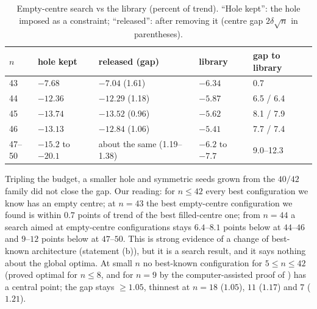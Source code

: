 \documentclass[11pt]{amsart}
\theoremstyle{definition}
\begin{document}
\begin{table}[htbp]
\centering\small
\caption{Empty-centre search vs the library (percent of trend). ``Hole kept'': the hole imposed as a constraint; ``released'': after removing it (centre gap $2\delta\sqrt n$ in parentheses).}\label{tab:emptycentre}
\begin{tabular}{@{}lllll@{}}
\toprule
$n$ & hole kept & released (gap) & library & gap to library \\
\midrule
43 & $-7.68$ & $-7.04$ (1.61) & $-6.34$ & 0.7 \\
44 & $-12.36$ & $-12.29$ (1.18) & $-5.87$ & 6.5 / 6.4 \\
45 & $-13.74$ & $-13.52$ (0.96) & $-5.62$ & 8.1 / 7.9 \\
46 & $-13.13$ & $-12.84$ (1.06) & $-5.41$ & 7.7 / 7.4 \\
47--50 & $-15.2$ to $-20.1$ & about the same (1.19--1.38) & $-6.2$ to $-7.7$ & 9.0--12.3 \\
\bottomrule
\end{tabular}
\end{table}

Tripling the budget, a smaller hole and symmetric seeds grown from the $40/42$ family did not close the gap. Our reading: for $n \le 42$ every best configuration we know has an empty centre; at $n = 43$ the best empty-centre configuration we found is within $0.7$ points of trend of the best filled-centre one; from $n = 44$ a search aimed at empty-centre configurations stays $6.4$--$8.1$ points below at $44$--$46$ and $9$--$12$ points below at $47$--$50$. This is strong evidence of a change of best-known architecture (statement (b)), but it is a search result, and it says nothing about the global optima. %
At small $n$ no best-known configuration for $5 \le n \le 42$ (proved optimal for $n \le 8$, and for $n = 9$ by the computer-assisted proof of \cite{N9}) has a central point; the gap stays $\ge 1.05$, thinnest at $n = 18$ ($1.05$), $11$ ($1.17$) and $7$ ($1.21$). %
\end{document}
